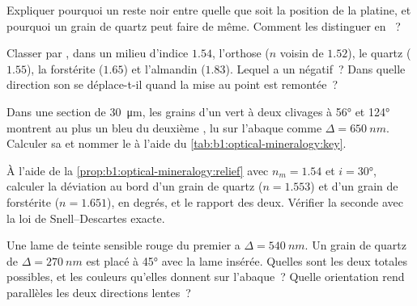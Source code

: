 \begin{exercise}[$\star$]\label{exo:b1:optical-mineralogy:3}
Expliquer pourquoi un  reste noir entre  quelle que soit
la position de la platine, et pourquoi un grain de quartz peut faire de même.
Comment les distinguer en ~?
\end{exercise}

\begin{exercise}[$\star$]\label{exo:b1:optical-mineralogy:4}
Classer par , dans un milieu d'indice $1.54$, l'orthose ($n$ voisin de
$1.52$), le quartz ($1.55$), la forstérite ($1.65$) et l'almandin ($1.83$). Lequel
a un  négatif~? Dans quelle direction son  se déplace-t-il
quand la mise au point est remontée~?
\end{exercise}

\begin{exercise}[$\star\star$]\label{exo:b1:optical-mineralogy:5}
Dans une section de \qty{30}{\micro m}, les grains d'un  vert 
à deux clivages à \ang{56} et \ang{124} montrent au plus un bleu du deuxième
, lu sur l'abaque comme $\Delta = \qty{650}{nm}$. Calculer sa 
et nommer le  à l'aide du \cref{tab:b1:optical-mineralogy:key}.
\end{exercise}

\begin{exercise}[$\star\star$]\label{exo:b1:optical-mineralogy:6}
À l'aide de la \cref{prop:b1:optical-mineralogy:relief} avec $n_m = 1.54$ et
$i = \ang{30}$, calculer la déviation au bord d'un grain de quartz
($n = 1.553$) et d'un grain de forstérite ($n = 1.651$), en degrés, et le
rapport des deux. Vérifier la seconde avec la loi de Snell--Descartes exacte.
\end{exercise}

\begin{exercise}[$\star\star$]\label{exo:b1:optical-mineralogy:7}
Une lame de teinte sensible rouge du premier  a $\Delta = \qty{540}{nm}$. Un
grain de quartz de $\Delta = \qty{270}{nm}$ est placé à \ang{45} avec la lame
insérée. Quelles sont les deux  totales possibles, et les
couleurs qu'elles donnent sur l'abaque~? Quelle orientation rend parallèles les
deux directions lentes~?
\end{exercise}


